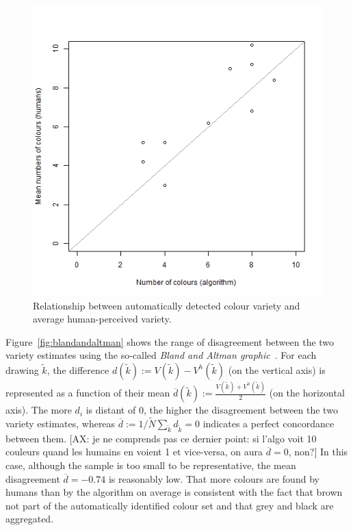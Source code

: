 \documentclass[11pt,a4paper]{article}
\begin{document}
\begin{figure}[h!]
	\centering
	\includegraphics[width=\linewidth]{figures/comp_nb_colours_scatter.png}
	\caption{Relationship between automatically detected colour variety and average human-perceived variety.}
	\label{fig:compnbcoloursscatter}
\end{figure}

Figure~\ref{fig:blandandaltman} shows the range of disagreement between the two variety estimates using the so-called \textit{Bland and Altman graphic}~\cite{bland1986}. For each drawing $\tilde{k}$, the difference $d(\tilde{k}) := V(\tilde{k}) - V^h(\tilde{k})$ (on the vertical axis) is represented as a function of their mean $\overline{d}(\tilde{k}) := \frac{V(\tilde{k}) + V^h(\tilde{k})}{2}$ (on the horizontal axis). The more $d_i$ is distant of  $0$, the higher the disagreement between the two variety estimates, whereas $\overline{d} := 1/\tilde{N}\sum_{\tilde{k}}d_{\tilde{k}} = 0$ indicates a perfect concordance between them. {\color{green}[AX: je ne comprends pas ce dernier point: si l'algo voit 10 couleurs quand les humains en voient 1 et vice-versa, on aura $\overline{d}=0$, non?]} In this case, although the sample is too small to be representative, the mean disagreement $\overline{d}=-0.74$ is reasonably low. That more colours are found by humans than by the algorithm on average is consistent with the fact that brown not part of the automatically identified colour set and that grey and black are aggregated.
\end{document}

